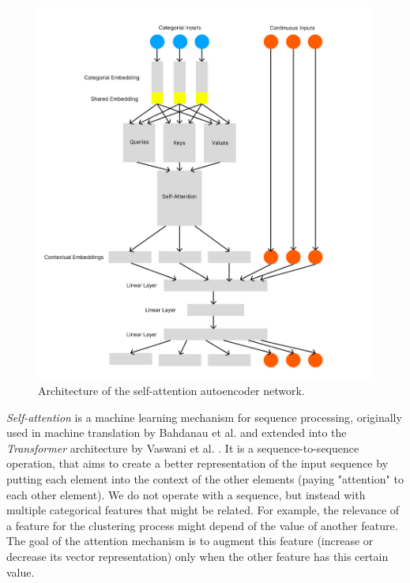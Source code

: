 \begin{figure}
\centering
	\includegraphics[width=1.2\linewidth]{attention_autoencoder.png}
	\caption{Architecture of the self-attention autoencoder network.}
	\label{attention_architecture}
\end{figure}

\textit{Self-attention} is a machine learning mechanism for sequence processing, originally used in machine translation by Bahdanau et al. \cite{bahdanau} and extended into the \textit{Transformer} architecture by Vaswani et al. \cite{attention_is_all_you_need}. It is a sequence-to-sequence operation, that aims to create a better representation of the input sequence by putting each element into the context of the other elements (paying "attention" to each other element). We do not operate with a sequence, but instead with multiple categorical features that might be related. For example, the relevance of a feature for the clustering process might depend of the value of another feature. The goal of the attention mechanism is to augment this feature (increase or decrease its vector representation) only when the other feature has this certain value. 

